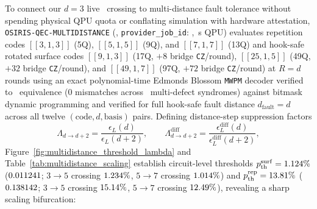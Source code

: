 \documentclass[aps,prx,twocolumn,superscriptaddress,nofootinbib]{revtex4-2}
\begin{document}
To connect our $d = 3$ live \remBackend\ crossing to multi-distance fault tolerance without spending physical QPU quota or conflating simulation with hardware attestation, \texttt{OSIRIS-QEC-MULTIDISTANCE} (\remSimTier, \texttt{provider\_job\_id}: \remSimJobId, \remSimQpuSec\,s QPU) evaluates repetition codes $[[3,1,3]]$ (5Q), $[[5,1,5]]$ (9Q), and $[[7,1,7]]$ (13Q) and hook-safe rotated surface codes $[[9,1,3]]$ (17Q, $+8$ bridge \texttt{CZ}/round), $[[25,1,5]]$ (49Q, $+32$ bridge \texttt{CZ}/round), and $[[49,1,7]]$ (97Q, $+72$ bridge \texttt{CZ}/round) at $R = d$ rounds using an exact polynomial-time Edmonds Blossom \texttt{MWPM} decoder verified to \remMultiBlossomMatchPct\ equivalence ($0$ mismatches across \remMultiBlossomSyndromes\ multi-defect syndromes) against bitmask dynamic programming and verified for full hook-safe fault distance $d_{\mathrm{fault}} = d$ across all twelve $(\text{code}, d, \text{basis})$ pairs. Defining distance-step suppression factors
\begin{equation}
  \Lambda_{d\to d+2} = \frac{\epsilon_L(d)}{\epsilon_L(d+2)}, \qquad
  \Lambda_{d\to d+2}^{\mathrm{diff}} = \frac{\epsilon_L^{\mathrm{diff}}(d)}{\epsilon_L^{\mathrm{diff}}(d+2)},
  \label{eq:multidistance_lambda}
\end{equation}
Figure~\ref{fig:multidistance_threshold_lambda} and Table~\ref{tab:multidistance_scaling} establish circuit-level thresholds $p_{\mathrm{th}}^{\mathrm{surf}} = 1.124\%$ ($0.011241$; $3\to 5$ crossing $1.234\%$, $5\to 7$ crossing $1.014\%$) and $p_{\mathrm{th}}^{\mathrm{rep}} = 13.81\%$ ($0.138142$; $3\to 5$ crossing $15.14\%$, $5\to 7$ crossing $12.49\%$), revealing a sharp scaling bifurcation:
\end{document}
